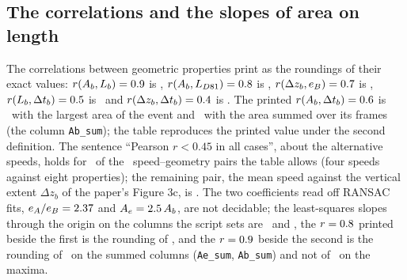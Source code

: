 \documentclass[preprint,11pt,authoryear]{elsarticle}
\begin{document}
\subsection{The correlations and the slopes of area on length}
The correlations between geometric properties print as the roundings of their exact values: $r(A_b, L_b) = 0.9$ is \RAbLbExact, $r(A_b, L_{D81}) = 0.8$ is \RAbLDExact, $r(\Delta z_b, e_B) = 0.7$ is \RDzEBExact, $r(L_b, \Delta t_b) = 0.5$ is \RLbDtExact\ and $r(\Delta z_b, \Delta t_b) = 0.4$ is \RDzDtExact. The printed $r(A_b, \Delta t_b) = 0.6$ is \RAbDtExact\ with the largest area of the event and \RAbDtSum\ with the area summed over its frames (the column \texttt{Ab\_sum}); the table reproduces the printed value under the second definition. The sentence ``Pearson $r < 0.45$ in all cases'', about the alternative speeds, holds for \SpeedPairsBelow\ of the \SpeedPairs\ speed--geometry pairs the table allows (four speeds against eight properties); the remaining pair, the mean speed against the vertical extent $\Delta z_b$ of the paper's Figure 3c, is \SpeedRMax. The two coefficients read off RANSAC fits, $e_A/e_B = 2.37$ and $A_e = 2.5\,A_b$, are not decidable; the least-squares slopes through the origin on the columns the script sets are \FitEAEBLs\ and \FitAeAbLs, the $r = 0.8$ printed beside the first is the rounding of \FitEAEBR, and the $r = 0.9$ beside the second is the rounding of \FitAeAbRSum\ on the summed columns (\texttt{Ae\_sum}, \texttt{Ab\_sum}) and not of \FitAeAbR\ on the maxima.
\end{document}
